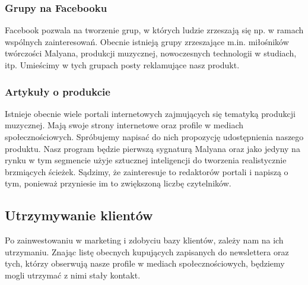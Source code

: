 \documentclass[12pt]{article}
\begin{document}
\subsubsection{Grupy na Facebooku}

Facebook pozwala na tworzenie grup, w których ludzie zrzeszają się np. w ramach wspólnych zainteresowań.
Obecnie istnieją grupy zrzeszające m.in. miłośników twórczości Malyana, produkcji muzycznej, nowoczesnych technologii w studiach, itp.
Umieścimy w tych grupach posty reklamujące nasz produkt.

\subsubsection{Artykuły o produkcie}


Istnieje obecnie wiele portali internetowych zajmujących się tematyką produkcji muzycznej.
Mają swoje strony internetowe oraz profile w mediach społecznościowych.
Spróbujemy napisać do nich propozycję udostępnienia naszego produktu.
Nasz program będzie pierwszą sygnaturą Malyana oraz jako jedyny na rynku w tym segmencie użyje sztucznej inteligencji do tworzenia realistycznie brzmiących ścieżek.
Sądzimy, że zainteresuje to redaktorów portali i napiszą o tym, ponieważ przyniesie im to zwiększoną liczbę czytelników.

\subsection{Utrzymywanie klientów}


Po zainwestowaniu w marketing i zdobyciu bazy klientów, zależy nam na ich utrzymaniu.
Znając listę obecnych kupujących zapisanych do newslettera oraz tych, którzy obserwują nasze profile w mediach społecznościowych, będziemy mogli utrzymać z nimi stały kontakt.
\end{document}
